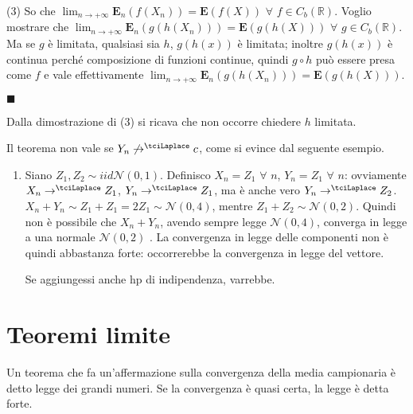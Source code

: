 \documentclass{article}
\begin{document}
(3) So che $\lim_{n\rightarrow +\infty }\mathbf{E}_{n}\left( f\left(
X_{n}\right) \right) =\mathbf{E}\left( f\left( X\right) \right) $ $\forall $ 
$f\in C_{b}\left( 
\mathbb{R}
\right) $. Voglio mostrare che $\lim_{n\rightarrow +\infty }\mathbf{E}%
_{n}\left( g\left( h\left( X_{n}\right) \right) \right) =\mathbf{E}\left(
g\left( h\left( X\right) \right) \right) $ $\forall $ $g\in C_{b}\left( 
\mathbb{R}
\right) $. Ma se $g$ \`{e} limitata, qualsiasi sia $h$, $g\left( h\left(
x\right) \right) $ \`{e} limitata; inoltre $g\left( h\left( x\right) \right) 
$ \`{e} continua perch\'{e} composizione di funzioni continue, quindi $%
g\circ h$ pu\`{o} essere presa come $f$ e vale effettivamente $%
\lim_{n\rightarrow +\infty }\mathbf{E}_{n}\left( g\left( h\left(
X_{n}\right) \right) \right) =\mathbf{E}\left( g\left( h\left( X\right)
\right) \right) $.

$\blacksquare $

Dalla dimostrazione di (3) si ricava che non occorre chiedere $h$ limitata.

Il teorema non vale se $Y_{n}\not\rightarrow ^{\tciLaplace }c$, come si
evince dal seguente esempio.

\begin{enumerate}
\item Siano $Z_{1},Z_{2}\sim iid\mathcal{N}\left( 0,1\right) $. Definisco $%
X_{n}=Z_{1}$ $\forall $ $n$, $Y_{n}=Z_{1}$ $\forall $ $n$: ovviamente $%
X_{n}\rightarrow ^{\tciLaplace }Z_{1}$, $Y_{n}\rightarrow ^{\tciLaplace
}Z_{1}$, ma \`{e} anche vero $Y_{n}\rightarrow ^{\tciLaplace }Z_{2}$. $%
X_{n}+Y_{n}\sim Z_{1}+Z_{1}=2Z_{1}\sim \mathcal{N}\left( 0,4\right) $,
mentre $Z_{1}+Z_{2}\sim \mathcal{N}\left( 0,2\right) $. Quindi non \`{e}
possibile che $X_{n}+Y_{n}$, avendo sempre legge $\mathcal{N}\left(
0,4\right) $, converga in legge a una normale $\mathcal{N}\left( 0,2\right) $%
. La convergenza in legge delle componenti non \`{e} quindi abbastanza
forte: occorrerebbe la convergenza in legge del vettore.

Se aggiungessi anche hp di indipendenza, varrebbe.
\end{enumerate}

\section{Teoremi limite}

Un teorema che fa un'affermazione sulla convergenza della media campionaria 
\`{e} detto legge dei grandi numeri. Se la convergenza \`{e} quasi certa, la
legge \`{e} detta forte.
\end{document}
